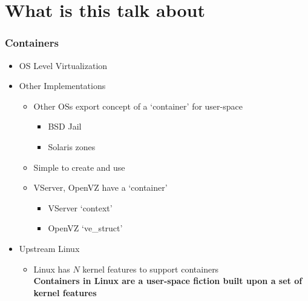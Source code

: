\documentclass{beamer}
\begin{document}
\section{What is this talk about} %
\begin{frame}
\frametitle{Containers}
\begin{itemize}
\item OS Level Virtualization
  \pause
\item Other Implementations
\begin{itemize}
  \item Other OSs export concept of a `container' for user-space
    \begin{itemize}
      \item BSD Jail
      \item Solaris zones
    \end{itemize}
  \item Simple to create and use

  \pause
  \item VServer, OpenVZ have a `container'
    \begin{itemize}
      \item VServer `context'
      \item OpenVZ `ve\_struct'
    \end{itemize}
\end{itemize}

  \pause
\item Upstream Linux
\begin{itemize}
  \item Linux has $N$ kernel features to support containers \\
  \vspace{0.15in}
  {\bf Containers in Linux are a user-space fiction built upon a set of kernel features}
\end{itemize}
\end{itemize}

\end{frame}
\end{document}
